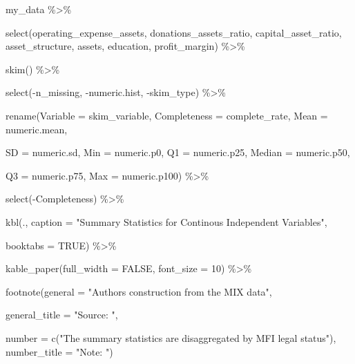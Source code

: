 \documentclass[a4paper,nobind]{templates/ociamthesis}
\newenvironment{Shaded}{\begin{snugshade}}{\end{snugshade}}
\newcommand{\AttributeTok}[1]{\textcolor[rgb]{0.77,0.63,0.00}{#1}}
\newcommand{\ConstantTok}[1]{\textcolor[rgb]{0.00,0.00,0.00}{#1}}
\newcommand{\DecValTok}[1]{\textcolor[rgb]{0.00,0.00,0.81}{#1}}
\newcommand{\FunctionTok}[1]{\textcolor[rgb]{0.00,0.00,0.00}{#1}}
\newcommand{\NormalTok}[1]{#1}
\newcommand{\SpecialCharTok}[1]{\textcolor[rgb]{0.00,0.00,0.00}{#1}}
\newcommand{\StringTok}[1]{\textcolor[rgb]{0.31,0.60,0.02}{#1}}
\renewenvironment{Shaded}
{
  \vspace{10pt}%
  \begin{snugshade}%
}{%
  \end{snugshade}%
  \vspace{8pt}%
}
\begin{document}
\begin{Shaded}
\begin{Highlighting}[]
\NormalTok{my\_data }\SpecialCharTok{\%\textgreater{}\%}
  
  \FunctionTok{select}\NormalTok{(operating\_expense\_assets, }
\NormalTok{          donations\_assets\_ratio, }
\NormalTok{          capital\_asset\_ratio,}
\NormalTok{          asset\_structure, assets, }
\NormalTok{          education, profit\_margin) }\SpecialCharTok{\%\textgreater{}\%} 
  
  \FunctionTok{skim}\NormalTok{() }\SpecialCharTok{\%\textgreater{}\%} 
  
  \FunctionTok{select}\NormalTok{(}\SpecialCharTok{{-}}\NormalTok{n\_missing, }\SpecialCharTok{{-}}\NormalTok{numeric.hist, }\SpecialCharTok{{-}}\NormalTok{skim\_type) }\SpecialCharTok{\%\textgreater{}\%} 
  
  \FunctionTok{rename}\NormalTok{(}\AttributeTok{Variable =}\NormalTok{ skim\_variable, }\AttributeTok{Completeness =}\NormalTok{ complete\_rate, }\AttributeTok{Mean =}\NormalTok{ numeric.mean, }
         
         \AttributeTok{SD =}\NormalTok{ numeric.sd, }\AttributeTok{Min =}\NormalTok{ numeric.p0, }\AttributeTok{Q1 =}\NormalTok{ numeric.p25, }\AttributeTok{Median =}\NormalTok{ numeric.p50, }
         
         \AttributeTok{Q3 =}\NormalTok{ numeric.p75, }\AttributeTok{Max =}\NormalTok{ numeric.p100) }\SpecialCharTok{\%\textgreater{}\%} 
  
  \FunctionTok{select}\NormalTok{(}\SpecialCharTok{{-}}\NormalTok{Completeness) }\SpecialCharTok{\%\textgreater{}\%} 
  
  \FunctionTok{kbl}\NormalTok{(., }\AttributeTok{caption =} \StringTok{"Summary Statistics for Continous Independent Variables"}\NormalTok{, }
      
      \AttributeTok{booktabs =} \ConstantTok{TRUE}\NormalTok{) }\SpecialCharTok{\%\textgreater{}\%} 
  
  \FunctionTok{kable\_paper}\NormalTok{(}\AttributeTok{full\_width =} \ConstantTok{FALSE}\NormalTok{, }\AttributeTok{font\_size =} \DecValTok{10}\NormalTok{) }\SpecialCharTok{\%\textgreater{}\%} 
  
  \FunctionTok{footnote}\NormalTok{(}\AttributeTok{general =} \StringTok{"Authors\textquotesingle{} construction from the MIX data"}\NormalTok{,}
           
           \AttributeTok{general\_title =} \StringTok{"Source: "}\NormalTok{,}
           
           \AttributeTok{number =} \FunctionTok{c}\NormalTok{(}\StringTok{"The summary statistics are disaggregated by MFI legal status"}\NormalTok{),}
           \AttributeTok{number\_title =} \StringTok{"Note: "}\NormalTok{)}
\end{Highlighting}
\end{Shaded}
\end{document}
